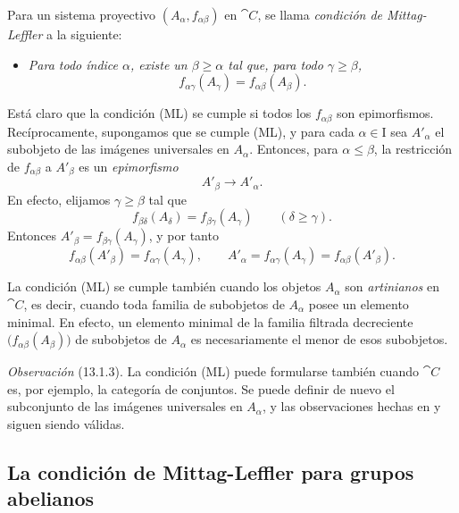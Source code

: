 \documentclass[oneside]{amsart}
\renewcommand{\leq}{\leqslant}
\renewcommand{\geq}{\geqslant}
\let\EGAOriginalLabel\label
\renewcommand{\label}[1]{\phantomsection\EGAOriginalLabel{#1}}
\begin{document}
\begin{env}[13.1.2]
\label{0.13.1.2}
Para un sistema proyectivo $(A_\alpha,f_{\alpha\beta})$ en $\cat{C}$,
se llama \emph{condición de Mittag-Leffler} a la siguiente:
\begin{itemize}
  \item[(ML)]
  \emph{Para todo índice $\alpha$, existe un $\beta\geq\alpha$ tal
  que, para todo $\gamma\geq\beta$,}
  \[
    f_{\alpha\gamma}(A_\gamma)
    =
    f_{\alpha\beta}(A_\beta).
  \]
\end{itemize}

Está claro que la condición (ML) se cumple si todos los
$f_{\alpha\beta}$ son epimorfismos.
Recíprocamente, supongamos que se cumple (ML), y para cada
$\alpha\in\mathrm{I}$ sea $A'_\alpha$ el subobjeto de las imágenes
universales en $A_\alpha$.
Entonces, para $\alpha\leq\beta$, la restricción de
$f_{\alpha\beta}$ a $A'_\beta$ es un \emph{epimorfismo}
\[
  A'_\beta\longrightarrow A'_\alpha.
\]
En efecto, elijamos $\gamma\geq\beta$ tal que
\[
  f_{\beta\delta}(A_\delta)
  =
  f_{\beta\gamma}(A_\gamma)
  \qquad(\delta\geq\gamma).
\]
Entonces $A'_\beta=f_{\beta\gamma}(A_\gamma)$, y por tanto
\[
  f_{\alpha\beta}(A'_\beta)
  =
  f_{\alpha\gamma}(A_\gamma),
  \qquad
  A'_\alpha
  =
  f_{\alpha\gamma}(A_\gamma)
  =
  f_{\alpha\beta}(A'_\beta).
\]

La condición (ML) se cumple también cuando los objetos $A_\alpha$ son
\emph{artinianos} en $\cat{C}$, es decir, cuando toda familia de
subobjetos de $A_\alpha$ posee un elemento minimal.
En efecto, un elemento minimal de la familia filtrada decreciente
$\bigl(f_{\alpha\beta}(A_\beta)\bigr)$ de subobjetos de $A_\alpha$
es necesariamente el menor de esos subobjetos.
\end{env}

\begin{env}[13.1.3]
\label{0.13.1.3}
\emph{Observación} (13.1.3).
La condición (ML) puede formularse también cuando $\cat{C}$ es, por
ejemplo, la categoría de conjuntos.
Se puede definir de nuevo el subconjunto de las imágenes universales en
$A_\alpha$, y las observaciones hechas en  y
 siguen siendo válidas.
\end{env}

\subsection{La condición de Mittag-Leffler para grupos abelianos}
\label{subsection:0.13.2}
\end{document}
